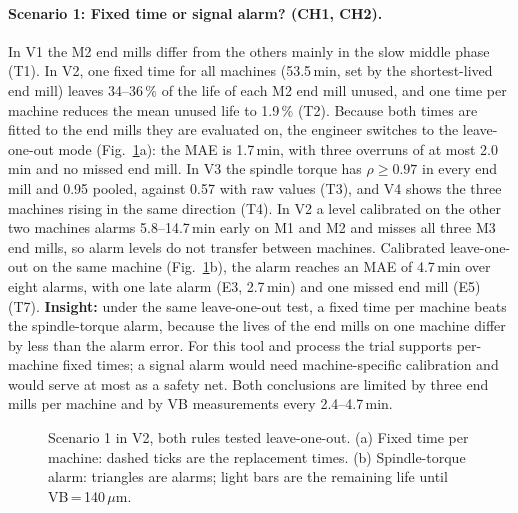 \paragraph{Scenario 1: Fixed time or signal alarm? (CH1, CH2).}
In V1 the M2 end mills differ from the others mainly in the slow middle phase (T1). In V2, one fixed time for
all machines (53.5\,min, set by the shortest-lived end mill) leaves 34--36\,\% of the life of each M2 end mill
unused, and one time per machine reduces the mean unused life to 1.9\,\% (T2). Because both times are fitted
to the end mills they are evaluated on, the engineer switches to the leave-one-out mode
(Fig.~\ref{fig:s1}a): the MAE is 1.7\,min, with three overruns of at most 2.0\,min and no missed end mill.
In V3 the spindle torque has $\rho\ge0.97$ in every end mill and 0.95 pooled, against 0.57 with raw values
(T3), and V4 shows the three machines rising in the same direction (T4). In V2 a level calibrated on the other
two machines alarms 5.8--14.7\,min early on M1 and M2 and misses all three M3 end mills, so alarm levels do
not transfer between machines. Calibrated leave-one-out on the same machine (Fig.~\ref{fig:s1}b), the alarm
reaches an MAE of 4.7\,min over eight alarms, with one late alarm (E3, 2.7\,min) and one missed end mill (E5)
(T7). \textbf{Insight:} under the same leave-one-out test, a fixed time per machine beats the spindle-torque
alarm, because the lives of the end mills on one machine differ by less than the alarm error. For this tool and
process the trial supports per-machine fixed times; a signal alarm would need machine-specific calibration
and would serve at most as a safety net. Both conclusions are limited by three end mills per machine and by
VB measurements every 2.4--4.7\,min.

\begin{figure}[t]
\centering
{}
\caption{Scenario 1 in V2, both rules tested leave-one-out. (a) Fixed time per machine: dashed ticks are
the replacement times. (b) Spindle-torque alarm: triangles are alarms; light bars are the remaining life until
VB\,=\,140\,$\mu$m.}
\label{fig:s1}
\end{figure}

